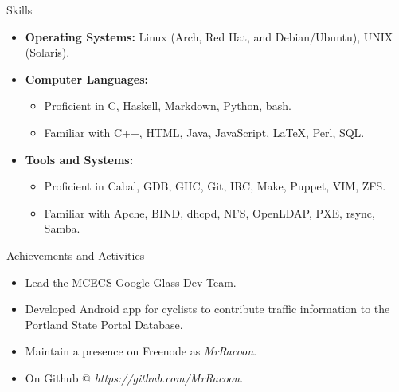\documentclass[11pt,oneside]{article}
\newenvironment{ressection}[1]{
	\vspace{4pt}
	{\fontfamily{phv}\selectfont\Large#1}
	\begin{itemize}
	\vspace{3pt}
}{
	\end{itemize}
}
\newcommand{\resitem}[1]{
	\vspace{-4pt}
	\item \begin{flushleft} #1 \end{flushleft}
}
\newcommand{\ressubitem}[1]{
	\vspace{-1pt}
	\item \begin{flushleft} #1 \end{flushleft}
}
\newenvironment{reslist}[1]{
	\resitem{\textbf{#1}}
	\vspace{-5pt}
	\begin{itemize}
}{
	\end{itemize}
}
\begin{document}
\begin{ressection}{Skills}

    \resitem{\textbf{Operating Systems:} Linux (Arch, Red Hat, and Debian/Ubuntu), UNIX (Solaris).}

	\begin{reslist}{Computer Languages:}

        \ressubitem{Proficient in C, Haskell, Markdown, Python, bash.}

        \ressubitem{Familiar with C++, HTML, Java, JavaScript, \LaTeX, Perl, SQL.}

	\end{reslist}

	\begin{reslist}{Tools and Systems:}

        \ressubitem{Proficient in Cabal, GDB, GHC, Git, IRC, Make, Puppet, VIM, ZFS.}

        \ressubitem{Familiar with Apche, BIND, dhcpd, NFS, OpenLDAP, PXE, rsync, Samba.}

	\end{reslist}


\end{ressection}


\begin{ressection}{Achievements and Activities}

    \resitem{Lead the MCECS Google Glass Dev Team.}

    \resitem{Developed Android app for cyclists to contribute traffic information to the Portland State Portal Database.}

    \resitem{Maintain a presence on Freenode as \textit{MrRacoon}.}

    \resitem{On Github @ \textit{https://github.com/MrRacoon}.}

\end{ressection}
\end{document}
